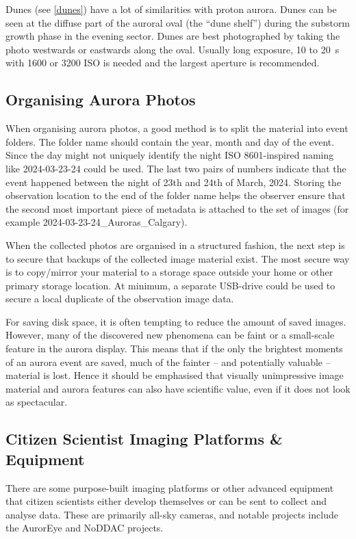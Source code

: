 \documentclass{article}
\begin{document}
Dunes (see \ref{dunes}) have a lot of similarities with proton aurora. Dunes can be seen at the diffuse part of the auroral oval (the ``dune shelf'') during the substorm growth phase in the evening sector. Dunes are best photographed by taking the photo westwards or eastwards along the oval. Usually long exposure, 10 to 20~s with 1600 or 3200 ISO is needed and the largest aperture is recommended.


\subsection{Organising Aurora Photos}\label{data_cit_storage}

When organising aurora photos, a good method is to split the material into event folders. The folder name should contain the year, month and day of the event. Since the day might not uniquely identify the night ISO 8601-inspired naming like 2024-03-23-24 could be used. The last two pairs of numbers indicate that the event happened between the night of 23th and 24th of March, 2024. Storing the observation location to the end of the folder name helps the observer ensure that the second most important piece of metadata is attached to the set of images (for example 2024-03-23-24\_Auroras\_Calgary).

When the collected photos are organised in a structured fashion, the next step is to secure that backups of the collected image material exist. The most secure way is to copy/mirror your material to a storage space outside your home or other primary storage location. At minimum, a separate USB-drive could be used to secure a local duplicate of the observation image data.

For saving disk space, it is often tempting to reduce the amount of saved images. However, many of the discovered new phenomena can be faint or a small-scale feature in the aurora display. This means that if the only the brightest moments of an aurora event are saved, much of the fainter -- and potentially valuable -- material is lost. Hence it should be emphasised that visually unimpressive image material and aurora features can also have scientific value, even if it does not look as spectacular.



\subsection{Citizen Scientist Imaging Platforms \& Equipment}
There are some purpose-built imaging platforms or other advanced equipment that citizen scientists either develop themselves or can be sent to collect and analyse data. These are primarily all-sky cameras, and notable projects include the AurorEye and NoDDAC projects.
\end{document}
